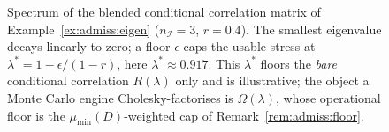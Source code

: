\begin{figure}[ht]
\centering
{}
\caption{Spectrum of the blended conditional correlation matrix of
Example~\ref{ex:admiss:eigen} ($n_{\mathcal I} = 3$, $r = 0.4$). The
smallest eigenvalue decays linearly to zero; a floor $\epsilon$ caps the
usable stress at $\lambda^\ast = 1 - \epsilon / (1 - r)$, here
$\lambda^\ast \approx 0.917$. This $\lambda^\ast$ floors the \emph{bare}
conditional correlation $R(\lambda)$ only and is illustrative; the object
a Monte Carlo engine Cholesky-factorises is $\Omega(\lambda)$, whose
operational floor is the $\mu_{\min}(D)$-weighted cap of
Remark~\ref{rem:admiss:floor}.}
\label{fig:admiss:eigen}
\end{figure}

